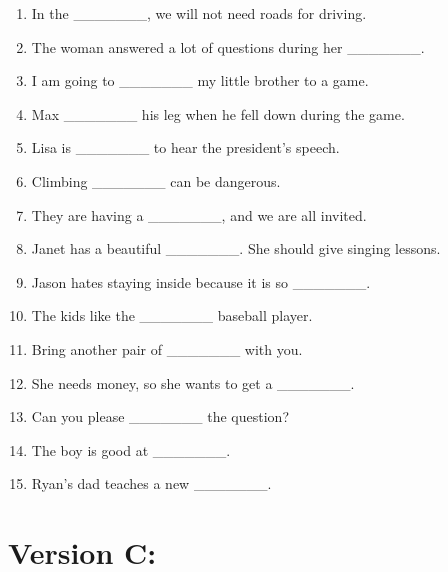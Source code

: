 \documentclass[a4paper,12pt]{article}
\begin{document}
\begin{enumerate}[label=\arabic*.]
    \item In the \_\_\_\_\_\_\_, we will not need roads for driving.
    \item The woman answered a lot of questions during her \_\_\_\_\_\_\_.
    \item I am going to \_\_\_\_\_\_\_ my little brother to a game.
    \item Max \_\_\_\_\_\_\_ his leg when he fell down during the game.
    \item Lisa is \_\_\_\_\_\_\_ to hear the president's speech.
    \item Climbing \_\_\_\_\_\_\_ can be dangerous.
    \item They are having a \_\_\_\_\_\_\_, and we are all invited.
    \item Janet has a beautiful \_\_\_\_\_\_\_. She should give singing lessons.
    \item Jason hates staying inside because it is so \_\_\_\_\_\_\_.
    \item The kids like the \_\_\_\_\_\_\_ baseball player.
    \item Bring another pair of \_\_\_\_\_\_\_ with you.
    \item She needs money, so she wants to get a \_\_\_\_\_\_\_.
    \item Can you please \_\_\_\_\_\_\_ the question?
    \item The boy is good at \_\_\_\_\_\_\_.
    \item Ryan's dad teaches a new \_\_\_\_\_\_\_.
\end{enumerate}

\newpage

\section*{Version C:}
\end{document}
